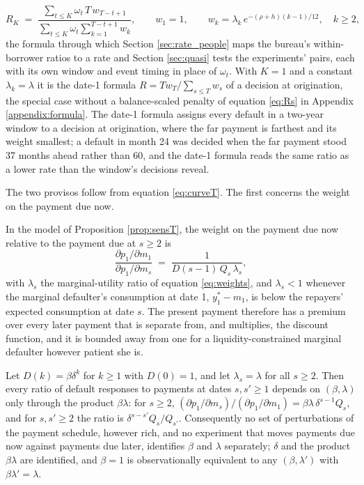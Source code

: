 \begin{equation}\label{eq:window}
R_K \;=\; \frac{\sum_{t \le K}\omega_t\, T\, w_{T-t+1}}{\sum_{t \le K}\omega_t \sum_{k=1}^{T-t+1} w_k}, \qquad w_1 = 1, \qquad w_k = \lambda_k\,e^{-(\rho + h)(k-1)/12}, \quad k \ge 2,
\end{equation}
the formula through which Section \ref{sec:rate_people} maps the bureau's within-borrower ratios to a rate and Section \ref{sec:quasi} tests the experiments' pairs, each with its own window and event timing in place of $\omega_t$. With $K = 1$ and a constant $\lambda_k = \lambda$ it is the date-1 formula $R = T w_T/\sum_{s \le T} w_s$ of a decision at origination, the special case without a balance-scaled penalty of equation \eqref{eq:Rs} in Appendix \ref{appendix:formula}. The date-1 formula assigns every default in a two-year window to a decision at origination, where the far payment is farthest and its weight smallest; a default in month 24 was decided when the far payment stood 37 months ahead rather than 60, and the date-1 formula reads the same ratio as a lower rate than the window's decisions reveal.

The two provisos follow from equation \eqref{eq:curveT}. The first concerns the weight on the payment due now.

\begin{proposition}\label{prop:premium}
In the model of Proposition \ref{prop:sensT}, the weight on the payment due now relative to the payment due at $s \ge 2$ is
\[
\frac{\partial p_1/\partial m_1}{\partial p_1/\partial m_s} \;=\; \frac{1}{D(s-1)\,Q_s\,\lambda_s},
\]
with $\lambda_s$ the marginal-utility ratio of equation \eqref{eq:weights}, and $\lambda_s < 1$ whenever the marginal defaulter's consumption at date 1, $y_1^* - m_1$, is below the repayers' expected consumption at date $s$. The present payment therefore has a premium over every later payment that is separate from, and multiplies, the discount function, and it is bounded away from one for a liquidity-constrained marginal defaulter however patient she is.
\end{proposition}

\begin{theorem}\label{thm:betalambda}
Let $D(k) = \beta\delta^k$ for $k \ge 1$ with $D(0) = 1$, and let $\lambda_s = \lambda$ for all $s \ge 2$. Then every ratio of default responses to payments at dates $s, s' \ge 1$ depends on $(\beta, \lambda)$ only through the product $\beta\lambda$: for $s \ge 2$, $(\partial p_1/\partial m_s)/(\partial p_1/\partial m_1) = \beta\lambda\,\delta^{s-1} Q_s$, and for $s, s' \ge 2$ the ratio is $\delta^{s-s'} Q_s/Q_{s'}$. Consequently no set of perturbations of the payment schedule, however rich, and no experiment that moves payments due now against payments due later, identifies $\beta$ and $\lambda$ separately; $\delta$ and the product $\beta\lambda$ are identified, and $\beta = 1$ is observationally equivalent to any $(\beta, \lambda')$ with $\beta\lambda' = \lambda$.
\end{theorem}

